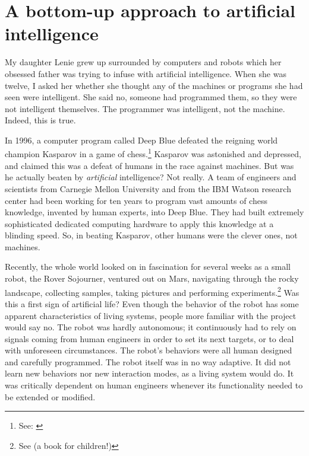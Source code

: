 \section{A bottom-up approach to artificial intelligence}

 My daughter Lenie grew up surrounded by computers and 
robots which her obsessed father was trying to infuse
with artificial intelligence. When she was twelve, I asked
her whether she thought any of the machines or 
programs she had seen were intelligent. 
She said no, someone had programmed them, so they were
not intelligent themselves. The programmer was 
intelligent, not the machine. Indeed, this is true. 

In 1996, a computer program called Deep Blue
defeated the reigning world champion Kasparov in a game of 
chess.\footnote{See: \cite{Newborn:1996}}
Kasparov was astonished
and depressed, and claimed this was a defeat of humans in 
the 
race against machines. But was he actually beaten by {\it artificial}
intelligence? Not really. A team of engineers and scientists
from Carnegie Mellon University and from the IBM Watson 
research center had been working for ten years to program 
vast amounts of chess knowledge, invented by
human experts, into Deep Blue. They had built extremely 
sophisticated dedicated computing hardware to
apply this knowledge at a blinding speed. So, in beating Kasparov, 
other humans were the clever ones, not machines. 

Recently, the whole world looked on in fascination
for several weeks as a small robot, the Rover Sojourner, ventured
out on Mars, navigating through the rocky landscape, collecting
samples, taking pictures and performing 
experiments.\footnote{
See \cite{Wunsch:1998} (a book for children!)}
Was this a first sign of artificial life? Even though the 
behavior of the robot has some apparent characteristics
of living systems, people more
familiar with the project would say no. 
The robot was hardly autonomous; it continuously had to rely
on signals coming from human engineers in order to set
its next targets, or to deal with unforeseen circumstances. 
The robot's behaviors were
all human designed and carefully programmed. The robot 
itself was in no way adaptive. It did not learn new behaviors
nor new interaction modes, as a living system would do.
It was critically dependent on human engineers whenever its
functionality needed to be extended or modified. 

